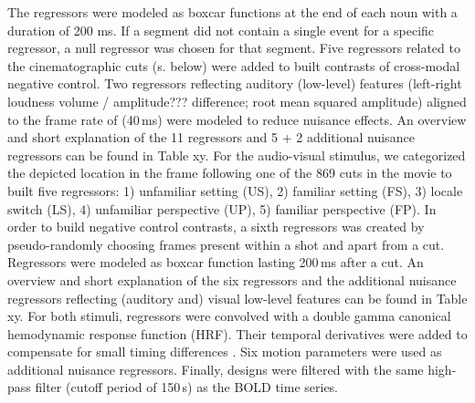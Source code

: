 \documentclass[english]{article}
\begin{document}
The regressors were modeled as boxcar functions at the end of each noun with a duration of 200 ms.
If a segment did not contain a single event for a specific regressor, a null regressor was chosen for that segment.
Five regressors related to the cinematographic cuts (s. below) were added to built contrasts of cross-modal negative control.
Two regressors reflecting auditory (low-level) features (left-right loudness volume / amplitude??? difference; root mean squared amplitude) aligned to the frame rate of (40\,ms) were modeled to reduce nuisance effects.
An overview and short explanation of the 11 regressors and 5 + 2 additional nuisance regressors can be found in Table xy.
For the audio-visual stimulus, we categorized the depicted location in the frame following one of the 869 cuts in the movie to built five regressors: 1) unfamiliar setting (US), 2) familiar setting (FS), 3) locale switch (LS), 4) unfamiliar perspective (UP), 5) familiar perspective (FP).
In order to build negative control contrasts, a sixth regressors was created by pseudo-randomly choosing frames present within a shot and apart from a cut. Regressors were modeled as boxcar function lasting 200\,ms after a cut.
An overview and short explanation of the six regressors and the additional nuisance regressors reflecting (auditory and) visual low-level features can be found in Table xy.
For both stimuli, regressors were convolved with a double gamma canonical hemodynamic response function (HRF).
Their temporal derivatives were added to compensate for small timing differences \citep{friston1998event}.
Six motion parameters were used as additional nuisance regressors. Finally, designs were filtered with the same high-pass filter (cutoff period of 150\,s) as the BOLD time series.
\end{document}
